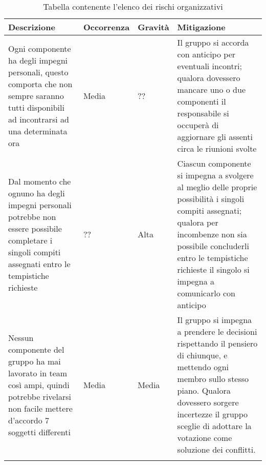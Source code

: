 \documentclass[../piano_di_progetto.tex]{subfiles}
\begin{document}
\begin{center}
	\begin{longtable}{| p{3.5cm} | p{2cm}|p{2cm}|p{3.5cm}|}
		\hline
		\rowcolor{lightgray}
		{\textbf{Descrizione}} & {\textbf{Occorrenza}} & {\textbf{Gravità}} & {\textbf{Mitigazione}} \\

		\hline
			Ogni componente ha degli impegni personali, questo comporta che non sempre saranno tutti disponibili ad incontrarsi ad una determinata ora
			&
			Media
			& 
			??
			&
			Il gruppo si accorda con anticipo per eventuali incontri; qualora dovessero mancare uno o due componenti il responsabile si occuperà di aggiornare gli assenti circa le riunioni svolte 
\\			
			\hline
			Dal momento che ognuno ha degli impegni personali potrebbe non essere possibile completare i singoli compiti assegnati entro le tempistiche richieste

			&
			??
			& 
			Alta
			& 
			Ciascun componente si impegna a svolgere al meglio delle proprie possibilità i singoli compiti assegnati; qualora per incombenze non sia possibile concluderli entro le tempistiche richieste il singolo si impegna a comunicarlo con anticipo\\
			\hline
			Nessun componente del gruppo ha mai lavorato in team così ampi, quindi potrebbe rivelarsi non facile mettere d’accordo 7 soggetti differenti
			&
			Media
			&
			Media
			&
			Il gruppo si impegna a prendere le decisioni rispettando il pensiero di chiunque, e mettendo ogni membro sullo stesso piano. Qualora dovessero sorgere incertezze il gruppo sceglie di adottare la votazione come soluzione dei conflitti. \\
\hline

\caption{Tabella contenente l'elenco dei rischi organizzativi}
	\end{longtable}

\end{center}
\end{document}
